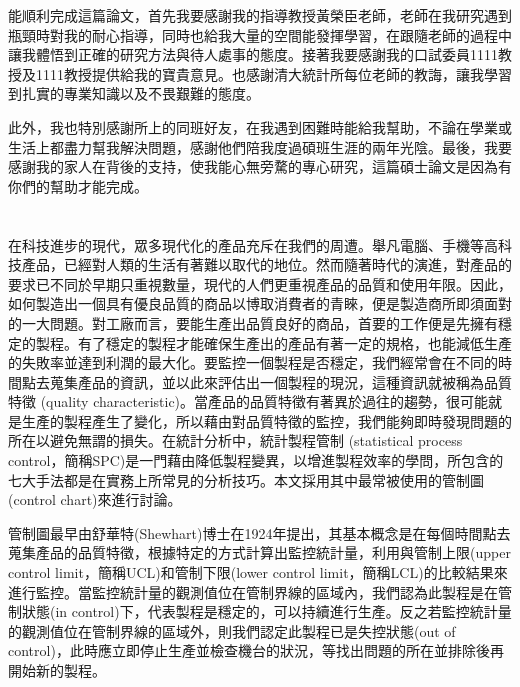 \documentclass[12pt]{article}  %
\theoremstyle{plain}
\newcommand\specialsectioning{\setcounter{secnumdepth}{-2}}
\begin{document}
\newpage
\begin{center}
\end{center}
\quad   
%
%
\newpage  %
%
\begin{center}
\end{center}
\qquad 能順利完成這篇論文，首先我要感謝我的指導教授黃榮臣老師，老師在我研究遇到瓶頸時對我的耐心指導，同時也給我大量的空間能發揮學習，在跟隨老師的過程中讓我體悟到正確的研究方法與待人處事的態度。接著我要感謝我的口試委員1111教授及1111教授提供給我的寶貴意見。也感謝清大統計所每位老師的教誨，讓我學習到扎實的專業知識以及不畏艱難的態度。

此外，我也特別感謝所上的同班好友，在我遇到困難時能給我幫助，不論在學業或生活上都盡力幫我解決問題，感謝他們陪我度過碩班生涯的兩年光陰。最後，我要感謝我的家人在背後的支持，使我能心無旁騖的專心研究，這篇碩士論文是因為有你們的幫助才能完成。

\newpage
\tableofcontents
\newpage

\specialsectioning
\section{}
\subsection{}
在科技進步的現代，眾多現代化的產品充斥在我們的周遭。舉凡電腦、手機等高科技產品，已經對人類的生活有著難以取代的地位。然而隨著時代的演進，對產品的要求已不同於早期只重視數量，現代的人們更重視產品的品質和使用年限。因此，如何製造出一個具有優良品質的商品以博取消費者的青睞，便是製造商所即須面對的一大問題。對工廠而言，要能生產出品質良好的商品，首要的工作便是先擁有穩定的製程。有了穩定的製程才能確保生產出的產品有著一定的規格，也能減低生產的失敗率並達到利潤的最大化。要監控一個製程是否穩定，我們經常會在不同的時間點去蒐集產品的資訊，並以此來評估出一個製程的現況，這種資訊就被稱為品質特徵 (quality characteristic)。當產品的品質特徵有著異於過往的趨勢，很可能就是生產的製程產生了變化，所以藉由對品質特徵的監控，我們能夠即時發現問題的所在以避免無謂的損失。在統計分析中，統計製程管制 (statistical process control，簡稱SPC)是一門藉由降低製程變異，以增進製程效率的學問，所包含的七大手法都是在實務上所常見的分析技巧。本文採用其中最常被使用的管制圖 (control chart)來進行討論。

管制圖最早由舒華特(Shewhart)博士在1924年提出，其基本概念是在每個時間點去蒐集產品的品質特徵，根據特定的方式計算出監控統計量，利用與管制上限(upper control limit，簡稱UCL)和管制下限(lower control limit，簡稱LCL)的比較結果來進行監控。當監控統計量的觀測值位在管制界線的區域內，我們認為此製程是在管制狀態(in control)下，代表製程是穩定的，可以持續進行生產。反之若監控統計量的觀測值位在管制界線的區域外，則我們認定此製程已是失控狀態(out of control)，此時應立即停止生產並檢查機台的狀況，等找出問題的所在並排除後再開始新的製程。
\end{document}
